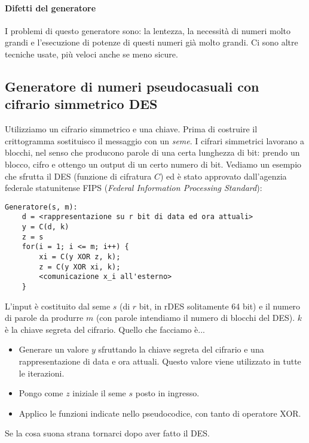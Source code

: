\paragraph{Difetti del generatore} I problemi di questo generatore sono: la lentezza, la necessità di numeri molto grandi e l'esecuzione di potenze di questi numeri già molto grandi. Ci sono altre tecniche usate, più veloci anche se meno sicure.


\subsection{Generatore di numeri pseudocasuali con cifrario simmetrico DES}
Utilizziamo un cifrario simmetrico e una chiave. Prima di costruire il crittogramma sostituisco il messaggio con un \emph{seme}. I cifrari simmetrici lavorano a blocchi, nel senso che producono parole di una certa lunghezza di bit: prendo un blocco, cifro e ottengo un output di un certo numero di bit. Vediamo un esempio che sfrutta il DES (funzione di cifratura $C$) ed è stato approvato dall'agenzia federale statunitense FIPS (\textit{Federal Information Processing Standard}):
\begin{verbatim}
Generatore(s, m): 
    d = <rappresentazione su r bit di data ed ora attuali>
    y = C(d, k)
    z = s
    for(i = 1; i <= m; i++) {
        xi = C(y XOR z, k);
        z = C(y XOR xi, k);
        <comunicazione x_i all'esterno>
    }
\end{verbatim}
L'input è costituito dal seme $s$ (di $r$ bit, in rDES solitamente 64 bit) e il numero di parole da produrre $m$ (con parole intendiamo il numero di blocchi del DES). $k$ è la chiave segreta del cifrario. Quello che facciamo è...
\begin{itemize}
	\item Generare un valore $y$ sfruttando la chiave segreta del cifrario e una rappresentazione di data e ora attuali. Questo valore viene utilizzato in tutte le iterazioni. 
	\item Pongo come $z$ iniziale il seme $s$ posto in ingresso. 
	\item Applico le funzioni indicate nello pseudocodice, con tanto di operatore XOR.
\end{itemize}
Se la cosa suona strana tornarci dopo aver fatto il DES.